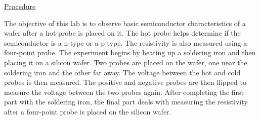 \documentclass[a4paper,10pt]{article}
\begin{document}
\underline{Procedure}

The objective of this lab is to observe basic semiconductor characteristics of a wafer after a hot-probe is placed on it. The hot probe helps determine if the semiconductor is a n-type or a p-type. The resistivity is also measured using a four-point probe. The experiment begins by heating up a soldering iron and then placing it on a silicon wafer. Two probes are placed on the wafer, one near the soldering iron and the other far away. The voltage between the hot and cold probes is then measured. The positive and negative probes are then flipped to measure the voltage between the two probes again. After completing the first part with the soldering iron, the final part deals with measuring the resistivity after a four-point probe is placed on the silicon wafer. \\
\end{document}
